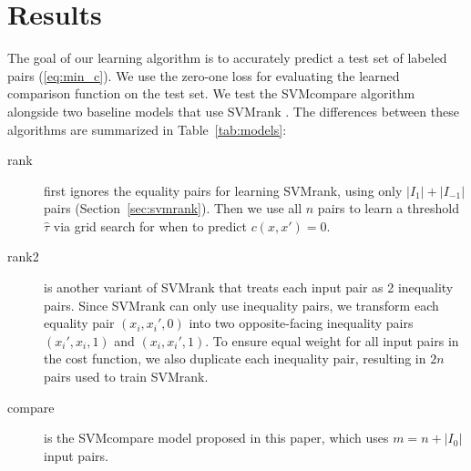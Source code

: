 \documentclass{article}
\begin{document}

\section{Results}
\label{sec:results}

The goal of our learning algorithm is to accurately predict a test set
of labeled pairs (\ref{eq:min_c}). We use the zero-one loss for
evaluating the learned comparison function on the test set.
We test the SVMcompare algorithm alongside two baseline models that
use SVMrank \citep{ranksvm}. The differences between these algorithms
are summarized in Table~\ref{tab:models}:

\begin{description}
\item[rank] first ignores the equality pairs for learning SVMrank,
  using only $|I_1|+|I_{-1}|$ pairs (Section~\ref{sec:svmrank}). Then
  we use all $n$ pairs to learn a threshold $\hat \tau$ via grid
  search for when to predict $c(x,x')=0$.
\item[rank2] is another variant of SVMrank that treats each input pair
  as 2 inequality pairs. Since SVMrank can only use inequality pairs,
  we transform each equality pair $(x_i,x_i',0)$ into two
  opposite-facing inequality pairs $(x_i',x_i,1)$ and
  $(x_i,x_i',1)$. To ensure equal weight for all input pairs in the
  cost function, we also duplicate each inequality pair, resulting in
  $2n$ pairs used to train SVMrank.
\item[compare] is the SVMcompare model proposed in this paper, which
  uses $m=n+|I_0|$ input pairs.
\end{description}
\end{document}
